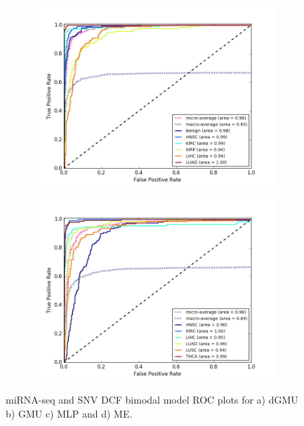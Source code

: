 \begin{figure}[H]
\begin{subfigure}[b]{0.49\textwidth}
         \caption{}
     \end{subfigure}
     \hfill
     \begin{subfigure}[b]{0.49\textwidth}
         \centering
         \includegraphics[width=\textwidth]{img/m_s/m_s_dcf_mlp_roc.png}
         \caption{}
     \end{subfigure}
     \begin{subfigure}[b]{0.49\textwidth}
         \centering
         \includegraphics[width=\textwidth]{img/m_s/m_s_dcf_moe_roc.png}
         \caption{}
     \end{subfigure}
        \caption{miRNA-seq and SNV DCF bimodal model ROC plots for a) dGMU b) GMU c) MLP and d) ME.}
        \label{fig:m_s_dcf_roc}
\end{figure}

